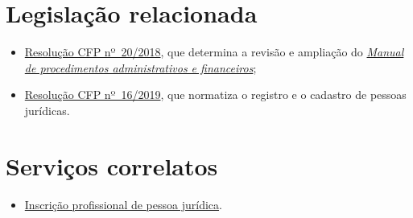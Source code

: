 \section{Legislação relacionada}

\begin{itemize}
  \item  \href{https://transparencia.cfp.org.br/wp-content/uploads/sites/7/2020/05/Manual-de-Procedimentos-Administrativos-e-Financeiro-CFP-RES-20.2018.pdf}{\href{https://atosoficiais.com.br/cfp/resolucao-administrativa-financeira-n-20-2018-altera-o-manual-de-procedimentos-administrativo-e-financeiro-do-sistema-conselhos-de-psicologia-anexo-da-resolucao-cfp-n-202018-a-resolucao-cfp-n-03-2007-a-resolucao-cfp-n-16-2019-e-da-outras-providencias}{Resolução  CFP nº~20/2018}}, que determina a revisão e ampliação do  \href{https://transparencia.cfp.org.br/wp-content/uploads/sites/7/2020/05/Manual-de-Procedimentos-Administrativos-e-Financeiro-CFP-RES-20.2018.pdf}{\emph{Manual  de procedimentos administrativos e financeiros}};
  \item  \href{https://atosoficiais.com.br/cfp/resolucao-administrativa-financeira-n-16-2019-altera-o-manual-de-procedimentos-administrativo-e-financeiro-do-sistema-conselhos-de-psicologia-anexo-da-resolucao-cfp-n-202018-a-resolucao-cfp-n-03-2007-a-resolucao-cfp-n-16-2019-e-da-outras-providencias}{Resolução  CFP nº~16/2019}, que normatiza o registro e o cadastro de pessoas  jurídicas.
\end{itemize}

\section{Serviços correlatos}

\begin{itemize}
  \item  \hyperref[chap:pj-inscricao]{Inscrição  profissional de pessoa jurídica}.
\end{itemize}

\sumario